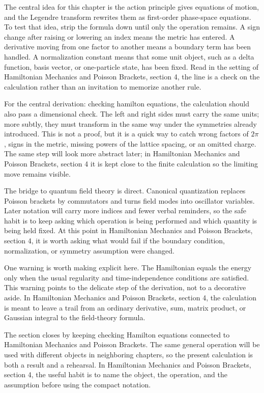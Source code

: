 The central idea for this chapter is the action principle gives equations of motion, and the Legendre transform rewrites them as first-order phase-space equations.  To test that idea, strip the formula down until only the operation remains.  A sign change after raising or lowering an index means the metric has entered.  A derivative moving from one factor to another means a boundary term has been handled.  A normalization constant means that some unit object, such as a delta function, basis vector, or one-particle state, has been fixed.  Read in the setting of Hamiltonian Mechanics and Poisson Brackets, section 4, the line is a check on the calculation rather than an invitation to memorize another rule.

For the central derivation: checking hamilton equations, the calculation should also pass a dimensional check.  The left and right sides must carry the same units; more subtly, they must transform in the same way under the symmetries already introduced.  This is not a proof, but it is a quick way to catch wrong factors of \(2\pi\), signs in the metric, missing powers of the lattice spacing, or an omitted charge.  The same step will look more abstract later; in Hamiltonian Mechanics and Poisson Brackets, section 4 it is kept close to the finite calculation so the limiting move remains visible.

The bridge to quantum field theory is direct.  Canonical quantization replaces Poisson brackets by commutators and turns field modes into oscillator variables.  Later notation will carry more indices and fewer verbal reminders, so the safe habit is to keep asking which operation is being performed and which quantity is being held fixed.  At this point in Hamiltonian Mechanics and Poisson Brackets, section 4, it is worth asking what would fail if the boundary condition, normalization, or symmetry assumption were changed.

One warning is worth making explicit here.  The Hamiltonian equals the energy only when the usual regularity and time-independence conditions are satisfied.  This warning points to the delicate step of the derivation, not to a decorative aside.  In Hamiltonian Mechanics and Poisson Brackets, section 4, the calculation is meant to leave a trail from an ordinary derivative, sum, matrix product, or Gaussian integral to the field-theory formula.

The section closes by keeping checking Hamilton equations connected to Hamiltonian Mechanics and Poisson Brackets.  The same general operation will be used with different objects in neighboring chapters, so the present calculation is both a result and a rehearsal.  In Hamiltonian Mechanics and Poisson Brackets, section 4, the useful habit is to name the object, the operation, and the assumption before using the compact notation.



